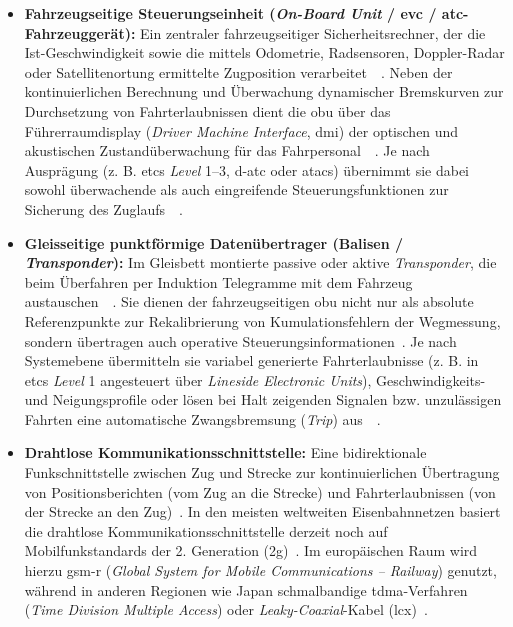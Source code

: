 \documentclass[runningheads]{res/llncs}
\begin{document}
\begin{itemize}
    \item \textbf{Fahrzeugseitige Steuerungseinheit (\textit{On-Board Unit} / \gls{evc} / \gls{atc}-Fahrzeuggerät):} Ein zentraler fahrzeugseitiger Sicherheitsrechner, der die Ist-Geschwindigkeit sowie die mittels Odometrie, Radsensoren, Doppler-Radar oder Satellitenortung ermittelte Zugposition verarbeitet~\parencite[S. 10]{xiangliuCyber2020}~\parencite[S. 101, 104]{trinckaufETCS2024}. Neben der kontinuierlichen Berechnung und Überwachung dynamischer Bremskurven zur Durchsetzung von Fahrterlaubnissen dient die \gls{obu} über das Führerraumdisplay (\textit{Driver Machine Interface}, \gls{dmi}) der optischen und akustischen Zustandüberwachung für das Fahrpersonal~\parencite[S. 10]{xiangliuCyber2020}~\parencite[S. 102--103]{trinckaufETCS2024}. Je nach Ausprägung (z. B. \gls{etcs} \textit{Level} 1--3, \gls{d-atc} oder \gls{atacs}) übernimmt sie dabei sowohl überwachende als auch eingreifende Steuerungsfunktionen zur Sicherung des Zuglaufs~\parencite[S. 14]{xiangliuCyber2020}~\parencite[S. 62--66]{trinckaufETCS2024}.
    \item \textbf{Gleisseitige punktförmige Datenübertrager (Balisen / \textit{Transponder}):} Im Gleisbett montierte passive oder aktive \textit{Transponder}, die beim Überfahren per Induktion Telegramme mit dem Fahrzeug austauschen~\parencite[S. 10--11]{xiangliuCyber2020}~\parencite[S. 75--76]{trinckaufETCS2024}. Sie dienen der fahrzeugseitigen \gls{obu} nicht nur als absolute Referenzpunkte zur Rekalibrierung von Kumulationsfehlern der Wegmessung, sondern übertragen auch operative Steuerungsinformationen~\parencite[S. 75, 79]{trinckaufETCS2024}. Je nach Systemebene übermitteln sie variabel generierte Fahrterlaubnisse (z. B. in \gls{etcs} \textit{Level} 1 angesteuert über \textit{Lineside Electronic Units}), Geschwindigkeits- und Neigungsprofile oder lösen bei Halt zeigenden Signalen bzw. unzulässigen Fahrten eine automatische Zwangsbremsung (\textit{Trip}) aus~\parencite[S. 62--63, 75, 253]{trinckaufETCS2024}~\parencite[S. 55]{gaggeroSurvey2024}.
    \item \textbf{Drahtlose Kommunikationsschnittstelle:} Eine bidirektionale Funkschnittstelle zwischen Zug und Strecke zur kontinuierlichen Übertragung von Positionsberichten (vom Zug an die Strecke) und Fahrterlaubnissen (von der Strecke an den Zug)~\parencite[S. 9--10]{xiangliuCyber2020}. 
    In den meisten weltweiten Eisenbahnnetzen basiert die drahtlose Kommunikationsschnittstelle derzeit noch auf Mobilfunkstandards der 2. Generation (\gls{2g})~\parencite[S. 12, 14]{xiangliuCyber2020}. Im europäischen Raum wird hierzu \gls{gsm-r} (\textit{Global System for Mobile Communications -- Railway}) genutzt, während in anderen Regionen wie Japan schmalbandige \gls{tdma}-Verfahren (\textit{Time Division Multiple Access}) oder \textit{Leaky-Coaxial}-Kabel (\gls{lcx})~\parencite[S. 12--14]{xiangliuCyber2020}. 

\end{itemize}
\end{document}
